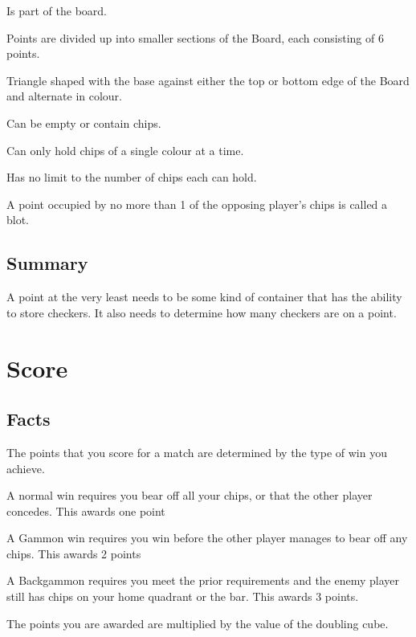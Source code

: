 \documentclass{report}
\begin{document}
    \begin{dashed}
        \item Is part of the board.
        \item Points are divided up into smaller sections of the Board, each consisting of 6 points.
        \item Triangle shaped with the base against either the top or bottom edge of the Board and alternate in colour.
        \item Can be empty or contain chips.
        \item Can only hold chips of a single colour at a time.
        \item Has no limit to the number of chips each can hold.
        \item A point occupied by no more than 1 of the opposing player’s chips is called a blot.
    \end{dashed}


    \subsection{Summary}

    A point at the very least needs to be some kind of container that has the ability
    to store checkers. It also needs to determine how many checkers are on a point.





    \newpage
    \section{Score}

    \subsection{Facts}

    \begin{dashed}
        \item The points that you score for a match are determined by the type of win you achieve.
        \item A normal win requires you bear off all your chips, or that the other player concedes. This    awards one point
        \item A Gammon win requires you win before the other player manages to bear off any chips. This awards 2 points
        \item A Backgammon requires you meet the prior requirements and the enemy player still has chips on your home quadrant or the bar. This awards 3 points.
        \item The points you are awarded are multiplied by the value of the doubling cube.
    \end{dashed}
\end{document}
